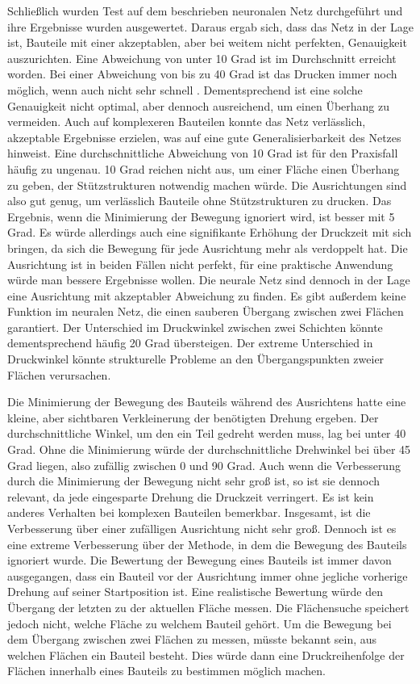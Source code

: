 Schließlich wurden Test auf dem beschrieben neuronalen Netz durchgeführt und ihre Ergebnisse wurden ausgewertet. Daraus ergab sich, dass das Netz in der Lage ist, Bauteile mit einer akzeptablen, aber bei weitem nicht perfekten, Genauigkeit auszurichten. 
Eine Abweichung von unter 10 Grad ist im Durchschnitt erreicht worden. Bei einer Abweichung von bis zu 40 Grad ist das Drucken immer noch möglich, wenn auch nicht sehr schnell \cite{jiang2018investigation}. 
Dementsprechend ist eine solche Genauigkeit nicht optimal, aber dennoch ausreichend, um einen Überhang zu vermeiden. Auch auf komplexeren Bauteilen konnte das Netz verlässlich, akzeptable Ergebnisse erzielen, 
was auf eine gute Generalisierbarkeit des Netzes hinweist. Eine durchschnittliche Abweichung von 10 Grad ist für den Praxisfall häufig zu ungenau. 10 Grad reichen nicht aus, um einer Fläche einen Überhang zu geben, der Stützstrukturen notwendig machen würde. 
Die Ausrichtungen sind also gut genug, um  verlässlich Bauteile ohne Stützstrukturen zu drucken.
Das Ergebnis, wenn die Minimierung der Bewegung ignoriert wird, ist besser mit 5 Grad. Es würde allerdings auch eine signifikante Erhöhung der Druckzeit mit sich bringen, da sich die Bewegung für jede Ausrichtung mehr als verdoppelt hat.
Die Ausrichtung ist in beiden Fällen nicht perfekt, für eine praktische Anwendung würde man bessere Ergebnisse wollen. Die neurale Netz sind dennoch in der Lage eine Ausrichtung mit akzeptabler Abweichung zu finden.
Es gibt außerdem keine Funktion im neuralen Netz, die einen sauberen Übergang zwischen zwei Flächen garantiert. Der Unterschied im Druckwinkel zwischen zwei Schichten könnte dementsprechend häufig 20 Grad übersteigen. 
Der extreme Unterschied in Druckwinkel könnte strukturelle Probleme an den Übergangspunkten zweier Flächen verursachen.

\smallskip

Die Minimierung der Bewegung des Bauteils während des Ausrichtens hatte eine kleine, aber sichtbaren Verkleinerung der benötigten Drehung ergeben. Der durchschnittliche Winkel, um den ein Teil gedreht werden muss, lag bei unter 40 Grad. 
Ohne die Minimierung würde der durchschnittliche Drehwinkel bei über 45 Grad liegen, also zufällig zwischen 0 und 90 Grad.
Auch wenn die Verbesserung durch die Minimierung der Bewegung nicht sehr groß ist, so ist sie dennoch relevant, da jede eingesparte Drehung die Druckzeit verringert. Es ist kein anderes Verhalten bei komplexen Bauteilen bemerkbar.
Insgesamt, ist die Verbesserung über einer zufälligen Ausrichtung nicht sehr groß. Dennoch ist es eine extreme Verbesserung über der Methode, in dem die Bewegung des Bauteils ignoriert wurde.
Die Bewertung der Bewegung eines Bauteils ist immer davon ausgegangen, dass ein Bauteil vor der Ausrichtung immer ohne jegliche vorherige Drehung auf seiner Startposition ist. Eine realistische Bewertung würde den Übergang der letzten zu der aktuellen Fläche messen.
Die Flächensuche speichert jedoch nicht, welche Fläche zu welchem Bauteil gehört. Um die Bewegung bei dem Übergang zwischen zwei Flächen zu messen, müsste bekannt sein, aus welchen Flächen ein Bauteil besteht.
Dies würde dann eine Druckreihenfolge der Flächen innerhalb eines Bauteils zu bestimmen möglich machen.

